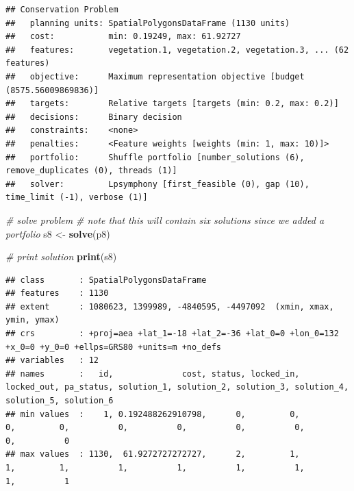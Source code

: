 \documentclass[12pt,]{book}
\newenvironment{Shaded}{\begin{snugshade}}{\end{snugshade}}
\newcommand{\KeywordTok}[1]{\textcolor[rgb]{0.13,0.29,0.53}{\textbf{#1}}}
\newcommand{\DecValTok}[1]{\textcolor[rgb]{0.00,0.00,0.81}{#1}}
\newcommand{\StringTok}[1]{\textcolor[rgb]{0.31,0.60,0.02}{#1}}
\newcommand{\CommentTok}[1]{\textcolor[rgb]{0.56,0.35,0.01}{\textit{#1}}}
\newcommand{\OperatorTok}[1]{\textcolor[rgb]{0.81,0.36,0.00}{\textbf{#1}}}
\newcommand{\NormalTok}[1]{#1}
\begin{document}
\begin{verbatim}
## Conservation Problem
##   planning units: SpatialPolygonsDataFrame (1130 units)
##   cost:           min: 0.19249, max: 61.92727
##   features:       vegetation.1, vegetation.2, vegetation.3, ... (62 features)
##   objective:      Maximum representation objective [budget (8575.56009869836)]
##   targets:        Relative targets [targets (min: 0.2, max: 0.2)]
##   decisions:      Binary decision 
##   constraints:    <none>
##   penalties:      <Feature weights [weights (min: 1, max: 10)]>
##   portfolio:      Shuffle portfolio [number_solutions (6), remove_duplicates (0), threads (1)]
##   solver:         Lpsymphony [first_feasible (0), gap (10), time_limit (-1), verbose (1)]
\end{verbatim}

\begin{Shaded}
\begin{Highlighting}[]
\CommentTok{# solve problem}
\CommentTok{# note that this will contain six solutions since we added a portfolio}
\NormalTok{s8 <-}\StringTok{ }\KeywordTok{solve}\NormalTok{(p8)}

\CommentTok{# print solution}
\KeywordTok{print}\NormalTok{(s8)}
\end{Highlighting}
\end{Shaded}

\begin{verbatim}
## class       : SpatialPolygonsDataFrame 
## features    : 1130 
## extent      : 1080623, 1399989, -4840595, -4497092  (xmin, xmax, ymin, ymax)
## crs         : +proj=aea +lat_1=-18 +lat_2=-36 +lat_0=0 +lon_0=132 +x_0=0 +y_0=0 +ellps=GRS80 +units=m +no_defs 
## variables   : 12
## names       :   id,              cost, status, locked_in, locked_out, pa_status, solution_1, solution_2, solution_3, solution_4, solution_5, solution_6 
## min values  :    1, 0.192488262910798,      0,         0,          0,         0,          0,          0,          0,          0,          0,          0 
## max values  : 1130,  61.9272727272727,      2,         1,          1,         1,          1,          1,          1,          1,          1,          1
\end{verbatim}

\begin{Shaded}
\end{Shaded}
\end{document}
